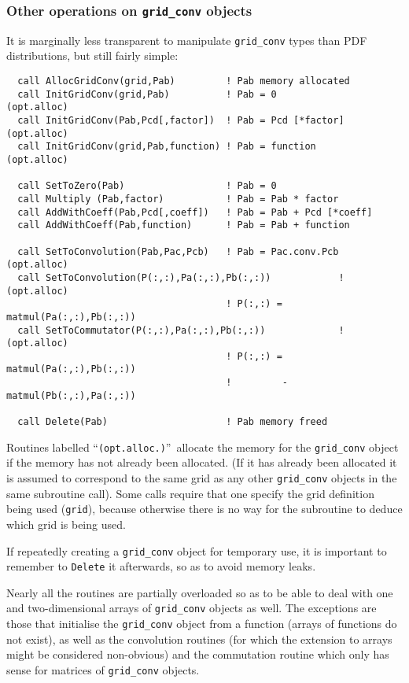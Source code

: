 \documentclass[12pt]{article}
\begin{document}
\subsubsection{Other operations on \texttt{grid\_conv} objects}
\label{sec:other_grid_conv_ops}
%
It is marginally less transparent to manipulate \texttt{grid\_conv} types
than PDF distributions, but still fairly simple:
\begin{lstlisting}
  call AllocGridConv(grid,Pab)         ! Pab memory allocated 
  call InitGridConv(grid,Pab)          ! Pab = 0             (opt.alloc)
  call InitGridConv(Pab,Pcd[,factor])  ! Pab = Pcd [*factor] (opt.alloc)
  call InitGridConv(grid,Pab,function) ! Pab = function      (opt.alloc)

  call SetToZero(Pab)                  ! Pab = 0
  call Multiply (Pab,factor)           ! Pab = Pab * factor
  call AddWithCoeff(Pab,Pcd[,coeff])   ! Pab = Pab + Pcd [*coeff]
  call AddWithCoeff(Pab,function)      ! Pab = Pab + function

  call SetToConvolution(Pab,Pac,Pcb)   ! Pab = Pac.conv.Pcb  (opt.alloc)
  call SetToConvolution(P(:,:),Pa(:,:),Pb(:,:))            ! (opt.alloc)
                                       ! P(:,:) = matmul(Pa(:,:),Pb(:,:))
  call SetToCommutator(P(:,:),Pa(:,:),Pb(:,:))             ! (opt.alloc)
                                       ! P(:,:) = matmul(Pa(:,:),Pb(:,:))
                                       !         -matmul(Pb(:,:),Pa(:,:))    

  call Delete(Pab)                     ! Pab memory freed
\end{lstlisting}
Routines labelled ``\texttt{(opt.alloc.)}''\ allocate the memory for
the \texttt{grid\_conv} object if the memory has not already been
allocated. (If it has already been allocated it is assumed to
correspond to the same grid as any other \texttt{grid\_conv} objects
in the same subroutine call). Some calls require that one specify the
grid definition being used (\texttt{grid}), because otherwise there is
no way for the subroutine to deduce which grid is being used.

If repeatedly creating a \texttt{grid\_conv} object for temporary use, it is
important to remember to \texttt{Delete} it afterwards, so as to avoid
memory leaks.

Nearly all the routines are partially overloaded so as to be able to
deal with one and two-dimensional arrays of \texttt{grid\_conv}
objects as well. The exceptions are those that initialise the
\texttt{grid\_conv} object from a function (arrays of functions do not
exist), as well as the convolution routines (for which the extension
to arrays might be considered non-obvious) and the commutation routine
which only has sense for matrices of \texttt{grid\_conv} objects.
\end{document}
